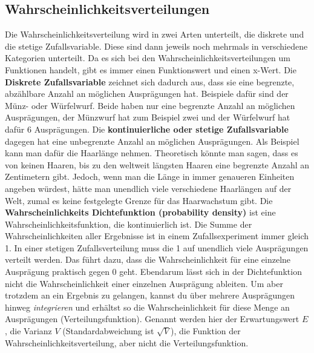 \documentclass{scrreprt}
\begin{document}
\subsection{Wahrscheinlichkeitsverteilungen}\label{Wahrscheinlichkeitsverteilungen} Die Wahrscheinlichkeitsverteilung wird in zwei Arten unterteilt, die diskrete und die stetige Zufallsvariable. Diese sind dann jeweils noch mehrmals in verschiedene Kategorien unterteilt. Da es sich bei den Wahrscheinlichkeitsverteilungen um Funktionen handelt, gibt es immer einen Funktionswert und einen x-Wert.
Die \textbf{Diskrete Zufallsvariable} zeichnet sich dadurch aus, dass sie eine begrenzte, abzählbare Anzahl an möglichen Ausprägungen hat. Beispiele dafür sind der Münz- oder Würfelwurf. Beide haben nur eine begrenzte Anzahl an möglichen Ausprägungen, der Münzwurf hat zum Beispiel zwei und der Würfelwurf hat dafür 6 Ausprägungen.
Die \textbf{kontinuierliche oder stetige Zufallsvariable} dagegen hat eine unbegrenzte Anzahl an möglichen Ausprägungen. Als Beispiel kann man dafür die Haarlänge nehmen. Theoretisch könnte man sagen, dass es von keinen Haaren, bis zu den weltweit längsten Haaren eine begrenzte Anzahl an Zentimetern gibt. Jedoch, wenn man die Länge in immer genaueren Einheiten angeben würdest, hätte man unendlich viele verschiedene Haarlängen auf der Welt, zumal es keine festgelegte Grenze für das Haarwachstum gibt.
Die \textbf{Wahrscheinlichkeits Dichtefunktion (probability density)} ist eine Wahrscheinlichkeitsfunktion, die kontinuierlich ist. 
Die Summe der Wahrscheinlichkeiten aller Ergebnisse ist in einem Zufallsexperiment immer gleich 1. In einer stetigen Zufallsverteilung muss die 1 auf unendlich viele Ausprägungen verteilt werden. Das führt dazu, dass die Wahrscheinlichkeit für eine einzelne Ausprägung praktisch gegen 0 geht. Ebendarum lässt sich in der Dichtefunktion nicht die Wahrscheinlichkeit einer einzelnen Ausprägung ableiten. Um aber trotzdem an ein Ergebnis zu gelangen, kannst du über mehrere Ausprägungen hinweg \textit{integrieren} und erhältst so die Wahrscheinlichkeit für diese Menge an Ausprägungen (Verteilungsfunktion).
Genannt werden hier der Erwartungswert $E$, die Varianz $V$ (Standardabweichung ist $\sqrt V$), die Funktion der Wahrscheinlichkeitsverteilung, aber nicht die Verteilungsfunktion.
\end{document}
